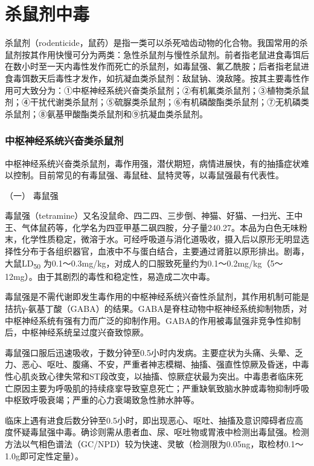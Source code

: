 \protect\hypertarget{text00144.html}{}{}

\section{杀鼠剂中毒}

杀鼠剂（rodenticide，鼠药）是指一类可以杀死啮齿动物的化合物。我国常用的杀鼠剂按其作用快慢可分为两类：急性杀鼠剂与慢性杀鼠剂。前者指老鼠进食毒饵后在数小时至一天内毒性发作而死亡的杀鼠剂，如毒鼠强、氟乙酰胺；后者指老鼠进食毒饵数天后毒性才发作，如抗凝血类杀鼠剂：敌鼠钠、溴敌隆。按其主要毒性作用可大致分为：①中枢神经系统兴奋类杀鼠剂；②有机氟类杀鼠剂；③植物类杀鼠剂；④干扰代谢类杀鼠剂；⑤硫脲类杀鼠剂；⑥有机磷酸酯类杀鼠剂；⑦无机磷类杀鼠剂；⑧氨基甲酸酯类杀鼠剂和⑨抗凝血类杀鼠剂。

\subsubsection{中枢神经系统兴奋类杀鼠剂}

中枢神经系统兴奋类杀鼠剂，毒作用强，潜伏期短，病情进展快，有的抽搐症状难以控制。目前常见的有毒鼠强、毒鼠硅、鼠特灵等，以毒鼠强最有代表性。

\hypertarget{text00144.htmlux5cux23CHP5-3-6-1-1}{}
（一） 毒鼠强

毒鼠强（tetramine）又名没鼠命、四二四、三步倒、神猫、好猫、一扫光、王中王、气体鼠药等，化学名为四亚甲基二砜四胺，分子量240.27。本品为白色无味粉末，化学性质稳定，微溶于水。可经呼吸道与消化道吸收，摄入后以原形无明显选择性分布于各组织器官，血液中不与蛋白结合，主要通过肾脏以原形排出。剧毒，大鼠LD\textsubscript{50}
为0.1～0.3mg/kg，对成人的口服致死量约为0.1～0.2mg/kg（5～12mg）。由于其剧烈的毒性和稳定性，易造成二次中毒。

毒鼠强是不需代谢即发生毒作用的中枢神经系统兴奋性杀鼠剂，其作用机制可能是拮抗γ-氨基丁酸（GABA）的结果。GABA是脊柱动物中枢神经系统抑制物质，对中枢神经系统有强有力而广泛的抑制作用。GABA的作用被毒鼠强非竞争性抑制后，中枢神经系统呈过度兴奋致惊厥。

毒鼠强口服后迅速吸收，于数分钟至0.5小时内发病。主要症状为头痛、头晕、乏力、恶心、呕吐、腹痛、不安，严重者神志模糊、抽搐、强直性惊厥及昏迷，中毒性心肌炎致心律失常和ST段改变，以抽搐、惊厥症状最为突出。中毒患者临床死亡原因主要为呼吸肌的持续痉挛导致窒息死亡；严重缺氧致脑水肿或毒物抑制呼吸中枢致呼吸衰竭；严重的心力衰竭致急性肺水肿等。

临床上遇有进食后数分钟至0.5小时，即出现恶心、呕吐、抽搐及意识障碍者应高度怀疑毒鼠强中毒。确诊则需从患者血、尿、呕吐物或胃液中检测出毒鼠强。检测方法以气相色谱法（GC/NPD）较为快速、灵敏（检测限为0.05ng，取检材0.1～1.0g即可定性定量）。

